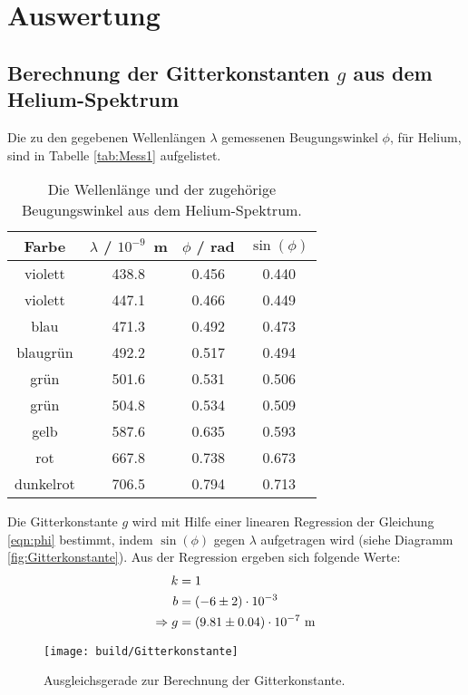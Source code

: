 \section{Auswertung}
\label{sec:Auswertung}

\subsection{Berechnung der Gitterkonstanten $g$ aus dem Helium-Spektrum}
Die zu den gegebenen Wellenlängen $\lambda$ gemessenen Beugungswinkel $\phi$, für Helium, sind in Tabelle \eqref{tab:Mess1} aufgelistet.

\begin{table}[H] %
  \centering
  \begin{tabular}{c| c c c}
    \toprule
    Farbe & $\lambda$ / $10^{-9}$\, m & $\phi$ / rad & $\sin(\phi)$ \\
    \midrule
      violett   & 438.8 & 0.456 & 0.440 \\
      violett   & 447.1 & 0.466 & 0.449 \\
      blau      & 471.3 & 0.492 & 0.473 \\
      blaugrün  & 492.2 & 0.517 & 0.494 \\
      grün      & 501.6 & 0.531 & 0.506 \\
      grün      & 504.8 & 0.534 & 0.509 \\
      gelb      & 587.6 & 0.635 & 0.593 \\
      rot       & 667.8 & 0.738 & 0.673 \\
      dunkelrot & 706.5 & 0.794 & 0.713 \\
    \bottomrule
  \end{tabular}
  \caption{Die Wellenlänge und der zugehörige Beugungswinkel aus dem Helium-Spektrum.}
  \label{tab:Mess1}
\end{table}

Die Gitterkonstante $g$ wird mit Hilfe einer linearen Regression der Gleichung \eqref{eqn:phi} bestimmt, indem $\sin(\phi)$ gegen $\lambda$ aufgetragen wird (siehe Diagramm \eqref{fig:Gitterkonstante}). Aus der Regression ergeben sich folgende Werte:
\begin{align*}
  k & = 1 \\
  b & = (\num{-6 +- 2}) \cdot 10^{-3} \\
  \Rightarrow g & = (\num{9.81 +- 0.04}) \cdot 10^{-7}\ \text{m}
\end{align*}

\begin{figure}[H]
  \centering
  \texttt{[image: build/Gitterkonstante]}
  \caption{Ausgleichsgerade zur Berechnung der Gitterkonstante.}
  \label{fig:Gitterkonstante}
\end{figure}

